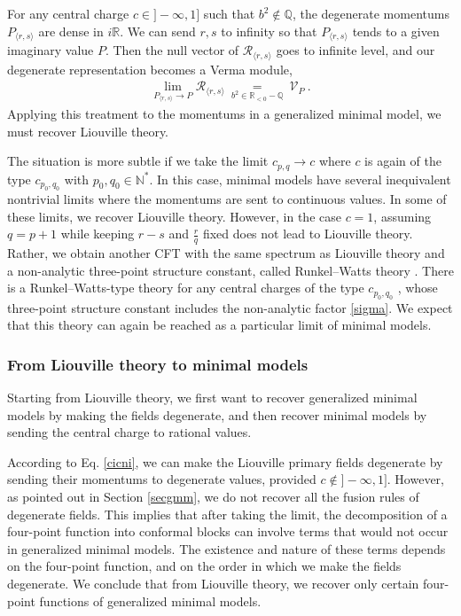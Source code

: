\documentclass[12pt, a4paper, notitlepage, twoside]{report}
\numberwithin{equation}{section}
\theoremstyle{break}
\begin{document}
For any central charge $c\in ]-\infty,1]$ such that $b^2\notin \mathbb{Q}$, the degenerate momentums $P_{\langle r,s\rangle}$ are dense in $i\mathbb{R}$. 
We can send $r,s$ to infinity so that $P_{\langle r,s\rangle}$ tends to a given imaginary value $P$. Then the null vector of $\mathcal{R}_{\langle r,s\rangle}$ goes to infinite level, and our degenerate representation becomes a Verma module,
\begin{align}
 \lim_{P_{\langle r,s\rangle} \to P} \mathcal{R}_{\langle r,s\rangle} 
 \ \underset{b^2\in \mathbb{R}_{<0}-\mathbb{Q}}{=} \
 \mathcal{V}_{P}\ .
\end{align}
Applying this treatment to the momentums in a generalized minimal model, we must recover Liouville theory.

The situation is more subtle if we take the limit $c_{p,q}\to c$ where  $c$ is again of the type $c_{p_0,q_0}$ with $p_0,q_0\in \mathbb{N}^*$. In this case, minimal models have several inequivalent nontrivial limits where the momentums are sent to continuous values. In some of these limits, we recover Liouville theory. However, in the case $c=1$, assuming $q=p+1$ while keeping $r-s$ and $\frac{r}{q}$ fixed 
does not lead to Liouville theory. Rather, we obtain another CFT with the same spectrum as Liouville theory and a non-analytic three-point structure constant, called Runkel--Watts theory \cite{rw01}. There is a Runkel--Watts-type theory for any central charges of the type $c_{p_0,q_0}$ \cite {rs15}, whose three-point structure constant includes the non-analytic factor \eqref{sigma}.
We expect that this theory can again be reached as a particular limit of minimal models.


\subsubsection{From Liouville theory to minimal models}

Starting from Liouville theory, we first want to recover generalized minimal models by making the fields degenerate, and then recover minimal models by sending the central charge to rational values. 

According to Eq. \eqref{cicni}, we can make the Liouville primary fields degenerate by sending their momentums to degenerate values, provided $c\notin ]-\infty, 1]$. However, as pointed out in Section \ref{secgmm}, we do not recover all the fusion rules of degenerate fields. This implies that after taking the limit, the decomposition of a four-point function into conformal blocks can involve terms that would not occur in generalized minimal models. The existence and nature of these terms depends on the four-point function, and on the order in which we make the fields degenerate. We conclude that from Liouville theory, we recover only certain four-point functions of generalized minimal models. 
\end{document}
